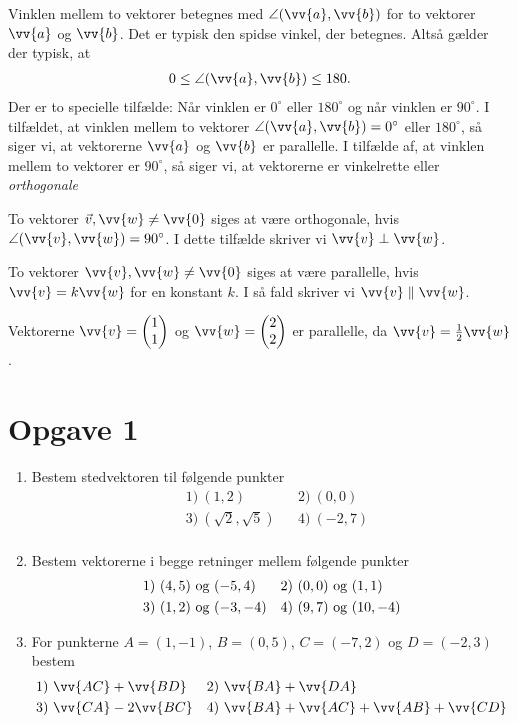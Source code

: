 Vinklen mellem to vektorer betegnes med $\angle (\vv{a},\vv{b})$ for to vektorer $\vv{a}$ og $\vv{b}$. Det er typisk den spidse vinkel, der betegnes. Altså gælder der typisk, at 
\begin{align*}
0\leq \angle (\vv{a},\vv{b})\leq 180.
\end{align*}
Der er to specielle tilfælde: Når vinklen er $0^{\circ}$ eller $180^{\circ}$ og når vinklen er $90^{\circ}$. I tilfældet, at vinklen mellem to vektorer $\angle (\vv{a},\vv{b}) = 0^{\circ}$ eller $180^\circ$, så siger vi, at vektorerne $\vv{a}$ og $\vv{b}$ er parallelle. I tilfælde af, at vinklen mellem to vektorer er $90^{\circ}$, så siger vi, at vektorerne er vinkelrette eller \textit{orthogonale}
\begin{defn}
To vektorer $\vec{v},\vv{w} \neq \vv{0}$ siges at være orthogonale, hvis $\angle(\vv{v},\vv{w}) = 90^\circ$. I dette tilfælde skriver vi $\vv{v} \perp \vv{w}$. 
\end{defn} 
\begin{defn}
To vektorer $\vv{v},\vv{w} \neq \vv{0}$ siges at være parallelle, hvis $\vv{v} = k\vv{w}$ for en konstant $k$. I så fald skriver vi $ \vv{v} \parallel \vv{w}$.
\end{defn}
\begin{exa}
Vektorerne $\vv{v} = \begin{pmatrix} 1\\1\end{pmatrix}$ og $\vv{w} = \begin{pmatrix}2\\ 2 \end{pmatrix}$ er parallelle, da $\vv{v} = \frac{1}{2} \vv{w}$.
\end{exa}


\section{Opgave 1}
\begin{enumerate}[label=\roman*)]
\item Bestem stedvektoren til følgende punkter 
\begin{align*}
&1) \ (1,2)   &&2) \  (0,0)  \\
&3) \  (\sqrt{2},\sqrt{5})  &&4) \ (-2,7)    \\
\end{align*}
\item Bestem vektorerne i begge retninger mellem følgende punkter
\begin{align*}
&1) \ (4,5) \textnormal{ og } (-5,4) &&2) \ (0,0) \textnormal{ og } (1,1)  \\
&3) \  (1,2)\textnormal{ og }(-3,-4)   &&4) \ (9,7)\textnormal{ og }(10,-4)   \\
\end{align*}
\item For punkterne $A = (1,-1)$, $B = (0,5)$, $C = (-7,2)$ og $D = (-2,3)$ bestem
\begin{align*}
&1) \ \vv{AC} + \vv{BD}  &&2) \ \vv{BA} + \vv{DA}   \\
&3) \ \vv{CA} - 2\vv{BC}  &&4) \ \vv{BA} + \vv{AC} + \vv{AB} + \vv{CD}   \\
\end{align*}
\end{enumerate}
